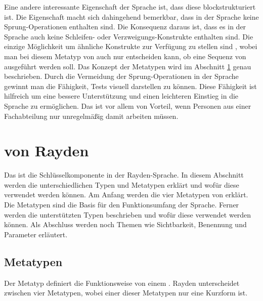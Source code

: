 \SuperPar
Eine andere interessante Eigenschaft der Sprache ist, dass diese blockstrukturiert ist. Die Eigenschaft macht sich dahingehend bemerkbar, dass in der Sprache keine Sprung-Operationen enthalten sind. Die Konsequenz daraus ist, dass es in der Sprache auch keine Schleifen- oder Verzweigungs-Konstrukte enthalten sind. Die einzige Möglichkeit um ähnliche Konstrukte zur Verfügung zu stellen sind , wobei man bei diesem Metatyp von  auch nur entscheiden kann, ob eine Sequenz von  ausgeführt werden soll. Das Konzept der Metatypen wird im Abschnitt \ref{cha:Keyword} genau beschrieben. Durch die Vermeidung der Sprung-Operationen in der Sprache gewinnt man die Fähigkeit, Tests visuell darstellen zu können. Diese Fähigkeit ist hilfreich um eine bessere Unterstützung und einen leichteren Einstieg in die Sprache zu ermöglichen. Das ist vor allem von Vorteil, wenn Personen aus einer Fachabteilung nur unregelmäßig damit arbeiten müssen. 


\section{ von Rayden}
\label{cha:Keyword}

Das  ist die Schlüsselkomponente in der Rayden-Sprache. In diesem Abschnitt werden die unterschiedlichen Typen und Metatypen erklärt und wofür diese verwendet werden können. Am Anfang werden die vier Metatypen von  erklärt. Die Metatypen sind die Basis für den Funktionsumfang der Sprache. Ferner werden die unterstützten Typen beschrieben und wofür diese verwendet werden können. Als Abschluss werden noch Themen wie Sichtbarkeit, Benennung und Parameter erläutert.


\subsection{Metatypen}

Der Metatyp definiert die Funktionsweise von einem . Rayden unterscheidet zwischen vier Metatypen, wobei einer dieser Metatypen nur eine Kurzform ist.


